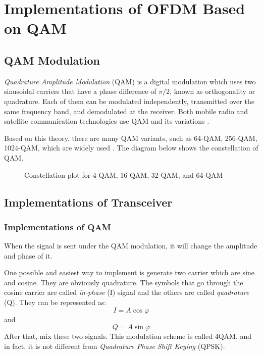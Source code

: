 \documentclass[11pt]{article}
\numberwithin{figure}{section}
\numberwithin{equation}{section}
\begin{document}
\section{Implementations of OFDM Based on QAM}
\subsection{QAM Modulation}
\textit{Quadrature Amplitude Modulation} (QAM) is a digital modulation which uses two sinusoidal carriers that have a phase difference of $\pi/2$, known as orthogonality or quadrature. Each of them can be modulated independently, transmitted over the same frequency band, and demodulated at the receiver. Both mobile radio and satellite communication technologies use QAM and its variations \cite{RN77}.

Based on this theory, there are many QAM variants, such as 64-QAM, 256-QAM, 1024-QAM, which are widely used \cite{RN77}. The diagram below shows the constellation of QAM.
\begin{figure}[!h]
    \centering
    
    \caption{Constellation plot for 4-QAM, 16-QAM, 32-QAM, and 64-QAM}
    \label{fig:Constellation of QAM}
\end{figure}
\subsection{Implementations of Transceiver}
\subsubsection{Implementations of QAM}
When the signal is sent under the QAM modulation, it will change the amplitude and phase of it. 

One possible and easiest way to implement is generate two carrier which are sine and cosine. They are obviously quadrature. The symbols that go through the cosine carrier are called \textit{in-phase} (I) signal and the others are called \textit{quadrature} (Q). They can be represented as: 
\begin{equation}
I = A\cos{\varphi} \label{con:i signal}
\end{equation}
and
\begin{equation}
Q = A\sin{\varphi} \label{con:q signal}
\end{equation}
After that, mix these two signals. This modulation scheme is called 4QAM, and in fact, it is not different from \textit{Quadrature Phase Shift Keying} (QPSK).
\end{document}

